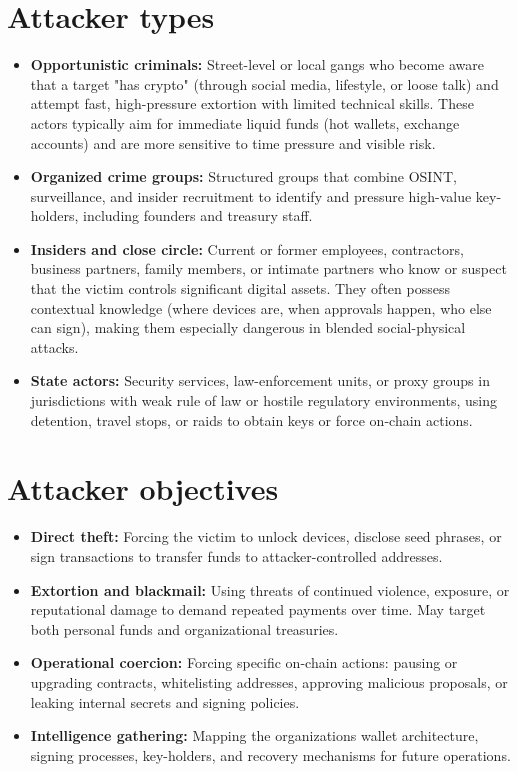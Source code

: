 \section{Attacker types}\label{attacker-types}

\begin{itemize}
\tightlist
\item
  \textbf{Opportunistic criminals:} Street-level or local gangs who become aware that a target "has crypto" (through social media, lifestyle, or loose talk) and attempt fast, high-pressure extortion with limited technical skills. These actors typically aim for immediate liquid funds (hot wallets, exchange accounts) and are more sensitive to time pressure and visible risk.
\item
  \textbf{Organized crime groups:} Structured groups that combine OSINT, surveillance, and insider recruitment to identify and pressure high-value key-holders, including founders and treasury staff.
\item
  \textbf{Insiders and close circle:} Current or former employees, contractors, business partners, family members, or intimate partners who know or suspect that the victim controls significant digital assets. They often possess contextual knowledge (where devices are, when approvals happen, who else can sign), making them especially dangerous in blended social-physical attacks.
\item
  \textbf{State actors:} Security services, law-enforcement units, or proxy groups in jurisdictions with weak rule of law or hostile regulatory environments, using detention, travel stops, or raids to obtain keys or force on-chain actions.
\end{itemize}

\section{Attacker objectives}\label{attacker-objectives}

\begin{itemize}
\tightlist
\item
  \textbf{Direct theft:} Forcing the victim to unlock devices, disclose seed phrases, or sign transactions to transfer funds to attacker-controlled addresses.
\item
  \textbf{Extortion and blackmail:} Using threats of continued violence, exposure, or reputational damage to demand repeated payments over time. May target both personal funds and organizational treasuries.
\item
  \textbf{Operational coercion:} Forcing specific on-chain actions: pausing or upgrading contracts, whitelisting addresses, approving malicious proposals, or leaking internal secrets and signing policies.
\item
  \textbf{Intelligence gathering:} Mapping the organization\textquotesingle s wallet architecture, signing processes, key-holders, and recovery mechanisms for future operations.
\end{itemize}

